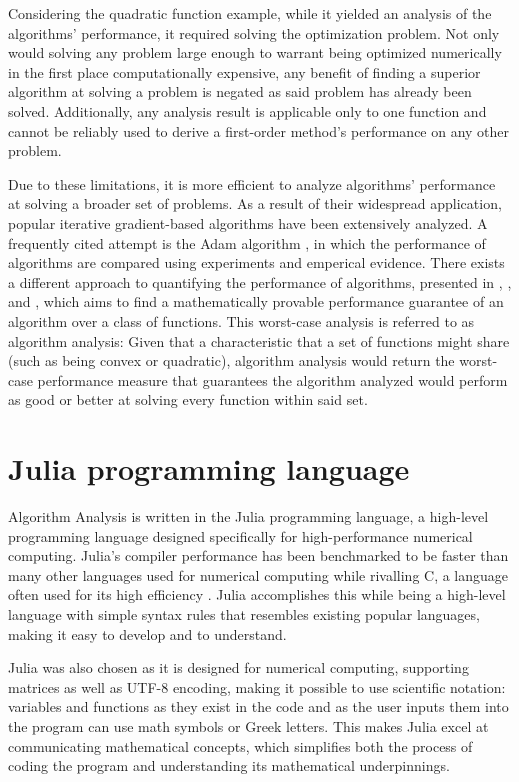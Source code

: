 Considering the quadratic function example, while it yielded an analysis of the algorithms' performance, it required solving the optimization problem. Not only would solving any problem large enough to warrant being optimized numerically in the first place computationally expensive, any benefit of finding a superior algorithm at solving a problem is negated as said problem has already been solved. Additionally, any analysis result is applicable only to one function and cannot be reliably used to derive a first-order method's performance on any other problem.

Due to these limitations, it is more efficient to analyze algorithms' performance at solving a broader set of problems. As a result of their widespread application, popular iterative gradient-based algorithms have been extensively analyzed. A frequently cited attempt is the Adam algorithm \cite{adam}, in which the performance of algorithms are compared using experiments and emperical evidence. There exists a different approach to quantifying the performance of algorithms, presented in \cite{drori2012}, \cite{taylor2016}, and \cite{lessard2016}, which aims to find a mathematically provable performance guarantee of an algorithm over a class of functions. This worst-case analysis is referred to as algorithm analysis: Given that a characteristic that a set of functions might share (such as being convex or quadratic), algorithm analysis would return the worst-case performance measure that guarantees the algorithm analyzed would perform as good or better at solving every function within said set.

\section{Julia programming language}

Algorithm Analysis is written in the Julia programming language, a high-level programming language designed specifically for high-performance numerical computing. Julia's compiler performance has been benchmarked to be faster than many other languages used for numerical computing while rivalling C, a language often used for its high efficiency \cite{julia}. Julia accomplishes this while being a high-level language with simple syntax rules that resembles existing popular languages, making it easy to develop and to understand.

Julia was also chosen as it is designed for numerical computing, supporting matrices as well as UTF-8 encoding, making it possible to use scientific notation: variables and functions as they exist in the code and as the user inputs them into the program can use math symbols or Greek letters. This makes Julia excel at communicating mathematical concepts, which simplifies both the process of coding the program and understanding its mathematical underpinnings.

